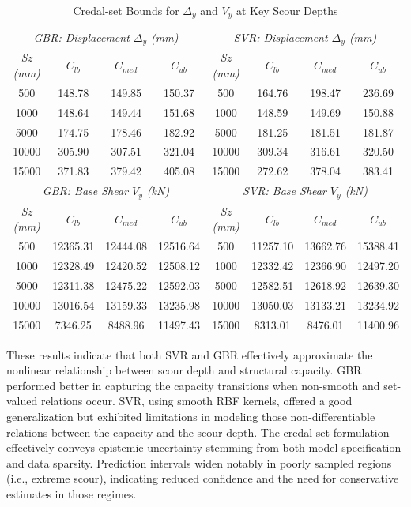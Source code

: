 \documentclass[authoryear,preprint,review,12pt]{elsarticle}
\begin{document}
\begin{table}[htbp]
\caption{Credal-set Bounds for $\Delta_y$ and $V_y$ at Key Scour Depths}
\label{tab:credal_bounds}
\centering
\small
\begin{tabular}{|c|ccc||c|ccc|}
\hline
\multicolumn{4}{|c||}{\textit{GBR: Displacement $\Delta_y$ (mm)}} & \multicolumn{4}{c|}{\textit{SVR: Displacement $\Delta_y$ (mm)}} \\
\textit{Sz (mm)} & \textit{$C_{lb}$} & \textit{$C_{med}$} & \textit{$C_{ub}$} & \textit{Sz (mm)} & \textit{$C_{lb}$} & \textit{$C_{med}$} & \textit{$C_{ub}$} \\
\hline
500   & 148.78 & 149.85 & 150.37 & 500   & 164.76 & 198.47 & 236.69 \\
1000  & 148.64 & 149.44 & 151.68 & 1000  & 148.59 & 149.69 & 150.88 \\
5000  & 174.75 & 178.46 & 182.92 & 5000  & 181.25 & 181.51 & 181.87 \\
10000 & 305.90 & 307.51 & 321.04 & 10000 & 309.34 & 316.61 & 320.50 \\
15000 & 371.83 & 379.42 & 405.08 & 15000 & 272.62 & 378.04 & 383.41 \\
\hline
\multicolumn{4}{|c||}{\textit{GBR: Base Shear $V_y$ (kN)}} & \multicolumn{4}{c|}{\textit{SVR: Base Shear $V_y$ (kN)}} \\
\textit{Sz (mm)} & \textit{$C_{lb}$} & \textit{$C_{med}$} & \textit{$C_{ub}$} & \textit{Sz (mm)} & \textit{$C_{lb}$} & \textit{$C_{med}$} & \textit{$C_{ub}$} \\
\hline
500   & 12365.31 & 12444.08 & 12516.64 & 500   & 11257.10 & 13662.76 & 15388.41 \\
1000  & 12328.49 & 12420.52 & 12508.12 & 1000  & 12332.42 & 12366.90 & 12497.20 \\
5000  & 12311.38 & 12475.22 & 12592.03 & 5000  & 12582.51 & 12618.92 & 12639.30 \\
10000 & 13016.54 & 13159.33 & 13235.98 & 10000 & 13050.03 & 13133.21 & 13234.92 \\
15000 & 7346.25  & 8488.96  & 11497.43 & 15000 & 8313.01  & 8476.01  & 11400.96 \\
\hline
\end{tabular}
\normalsize
\end{table}

These results indicate that both SVR and GBR effectively approximate the nonlinear relationship between scour depth and structural capacity. GBR performed better in capturing the capacity transitions when non-smooth and set-valued relations occur. SVR, using smooth RBF kernels, offered a good generalization but exhibited limitations in modeling those non-differentiable relations between the capacity and the scour depth.  The credal-set formulation effectively conveys epistemic uncertainty stemming from both model specification and data sparsity. Prediction intervals widen notably in poorly sampled regions (i.e., extreme scour), indicating reduced confidence and the need for conservative estimates in those regimes. 
\end{document}
